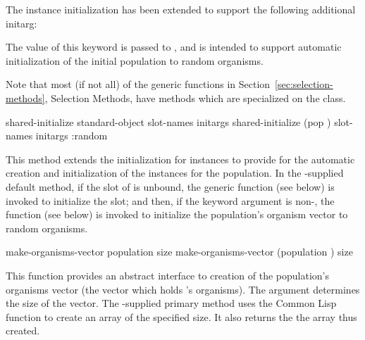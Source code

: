 \filbreak

{\samepage
The  instance initialization has been extended to support the following
additional initarg:


The value of this keyword is passed to , and is intended
to support automatic initialization of the initial population to random organisms.
\par}%
\gap
  
\filbreak

{\samepage


Note that most (if not all) of the generic functions in
Section~\ref{sec:selection-methods}, Selection Methods, have methods which
are specialized on the  class.

\filbreak

{\samepage
	
\Eggeneric shared-initialize {standard-object slot-names \rest initargs}
 shared-initialize {(pop ) slot-names \rest initargs
	\key :random}

This method extends the initialization for  instances to provide for the 
automatic creation and initialization of the  instances for the population.
In the \geco-supplied default method, if the  slot of 
 is unbound, the  generic function
(see below) is invoked to initialize the 
slot; and then, if the  keyword argument is non-, the
 function (see below) is invoked to initialize
the population's organism vector to random organisms.
\par}%

\filbreak

{\samepage
\Defgeneric make-organisms-vector {population size}
 make-organisms-vector {(population ) size}

This function provides an abstract interface to creation of the population's
organisms vector (the vector which holds 's organisms). The
 argument determines the size of the vector. The \geco-supplied primary
method uses the Common Lisp function  to create an array of the
specified size.
It also returns the the array thus created.
\par}%

}
